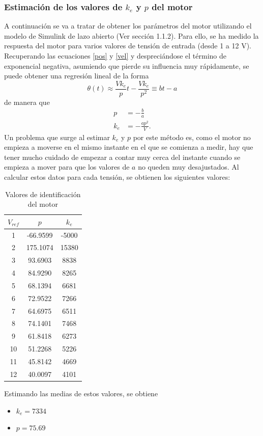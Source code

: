 \documentclass[a4paper, 12pt]{article}
\begin{document}
\subsubsection{Estimación de los valores de $k_e$ y $p$ del motor}
A continuación se va a tratar de obtener los parámetros del motor utilizando el modelo de Simulink de lazo abierto (Ver sección 1.1.2). 
Para ello, se ha medido la respuesta del motor para varios valores de tensión de entrada (desde 1 a 12 V). Recuperando las ecuaciones \ref{pos} y \ref{vel} y despreciándose el término de exponencial negativa, asumiendo que pierde su influencia muy rápidamente, se puede obtener una regresión lineal de la forma
\begin{equation}\label{poslin}
	\theta(t) \approx \frac{V k_e}{p}t - \frac{V k_e}{p^2} \equiv bt - a
\end{equation}
de manera que 
\begin{align}
	p &= -\frac{b}{a} \\
	k_e &= -\frac{ap^2}{V}.
\end{align}
Un problema que surge al estimar $k_e$ y $p$ por este método es, como el motor no empieza a moverse en el mismo instante en el que se comienza a medir, hay que tener mucho cuidado de empezar a contar muy cerca del instante cuando se empieza a mover para que los valores de $a$ no queden muy desajustados.
Al calcular estos datos para cada tensión, se obtienen los siguientes valores:
\newpage
\begin{table}[hbt!]
	\centering
		\begin{tabular}{ccc}
		$V_{ref}$ & $p$ & $k_e$ \\
		\hline
		1  & -66.9599 & -5000 \\
		2  & 175.1074 & 15380 \\
		3  & 93.6903  & 8838  \\
		4  & 84.9290  & 8265  \\
		5  & 68.1394  & 6681  \\
		6  & 72.9522  & 7266  \\
		7  & 64.6975  & 6511  \\
		8  & 74.1401  & 7468  \\
		9  & 61.8418  & 6273  \\
		10 & 51.2268  & 5226  \\
		11 & 45.8142  & 4669  \\
		12 & 40.0097  & 4101 
		\end{tabular}
		\caption{Valores de identificación del motor}
\end{table}
Estimando las medias de estos valores, se obtiene
\begin{itemize}
	\item $k_e = 7334$ 
	\item $p = 75.69$  
\end{itemize}
\end{document}
